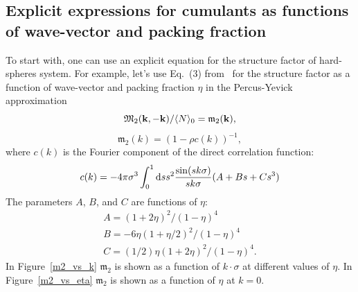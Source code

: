 \subsection{Explicit expressions for cumulants as functions of wave-vector and packing fraction}
To start with, one can use an explicit equation for the structure factor of hard-spheres system. For example, let's use Eq.~(3) from~\cite{Ashcroft1966} for the structure factor as a function of wave-vector and packing fraction $\eta$ in the Percus-Yevick approximation
\begin{equation}
	\mathfrak{M}_2(\vb k, -\vb k)/\langle N \rangle_0 = \mathfrak{m}_2(\vb k),
\end{equation}
\begin{equation}
	\mathfrak{m}_2(k) = (1 - \rho c(k))^{-1},
\end{equation}
where $c(k)$ is the Fourier component of the direct correlation function:
\begin{equation}
	c(k) = -4\pi\sigma^3\int_{0}^{1} {\rm d} s s^2 \frac{\sin(s k \sigma)}{s k \sigma} (A + Bs +Cs^3)
\end{equation}
The parameters $A$, $B$, and $C$ are functions of $\eta$:
\begin{eqnarray}
 A = (1+2\eta)^2/(1-\eta)^4 
 \nonumber\\
 B = -6\eta(1+\eta/2)^2/(1-\eta)^4
 \nonumber\\
 C = (1/2)\eta(1+2\eta)^2/(1-\eta)^4.
\end{eqnarray}
In Figure~\ref{m2_vs_k} $\mathfrak{m}_2$ is shown as a function of $k\cdot\sigma$ at different values of $\eta$. In Figure~\ref{m2_vs_eta} $\mathfrak{m}_2$ is shown as a function of $\eta$ at $k=0$.

